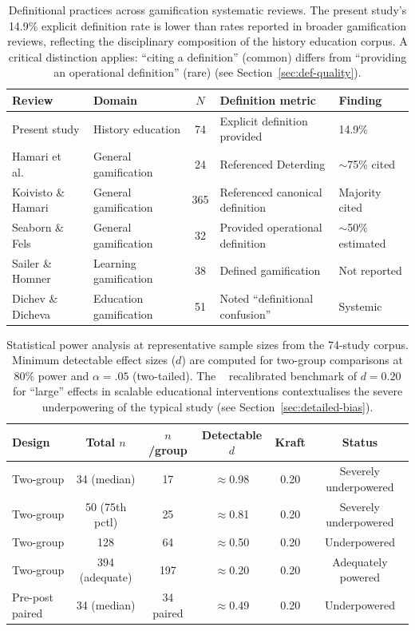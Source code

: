 \begin{table}[!h]
\centering
\caption{Definitional practices across gamification systematic reviews. The present study's 14.9\% explicit definition rate is lower than rates reported in broader gamification reviews, reflecting the disciplinary composition of the history education corpus. A critical distinction applies: ``citing a definition'' (common) differs from ``providing an operational definition'' (rare) (see Section~\ref{sec:def-quality}).}
\label{tab:cross-domain-definitions}
\small
\begin{tabular}{@{}p{3.5cm}p{2.5cm}cp{3cm}p{3cm}@{}}
\toprule
Review & Domain & $N$ & Definition metric & Finding \\
\midrule
Present study \cite{Korniienko2025mrqs} & History education & 74 & Explicit definition provided & 14.9\% \\
Hamari et al.\ \cite{Hamari2014} & General gamification & 24 & Referenced Deterding \cite{Deterding2011} & $\sim$75\% cited \\
Koivisto \& Hamari \cite{KoivistoHamari2019} & General gamification & 365 & Referenced canonical definition & Majority cited \\
Seaborn \& Fels \cite{SEABORN201514} & General gamification & 32 & Provided operational definition & $\sim$50\% estimated \\
Sailer \& Homner \cite{SailerHomner2020} & Learning gamification & 38 & Defined gamification & Not reported \\
Dichev \& Dicheva \citeauthor{DichevDicheva2017}~\cite{DichevDicheva2017} & Education gamification & 51 & Noted ``definitional confusion'' & Systemic \\
\bottomrule
\end{tabular}
\end{table}

\begin{table}[!h]
\centering
\caption{Statistical power analysis at representative sample sizes from the 74-study corpus. Minimum detectable effect sizes ($d$) are computed for two-group comparisons at 80\% power and $\alpha = .05$ (two-tailed). The \citeauthor{Kraft2020}~\cite{Kraft2020} recalibrated benchmark of $d = 0.20$ for ``large'' effects in scalable educational interventions contextualises the severe underpowering of the typical study (see Section~\ref{sec:detailed-bias}).}
\label{tab:power-analysis}
\small
\begin{tabular}{@{}lccccc@{}}
\toprule
Design & Total $n$ & $n$/group & Detectable $d$ & Kraft & Status \\
\midrule
Two-group & 34 (median) & 17 & $\approx$0.98 & 0.20 & Severely underpowered \\
Two-group & 50 (75th pctl) & 25 & $\approx$0.81 & 0.20 & Severely underpowered \\
Two-group & 128 & 64 & $\approx$0.50 & 0.20 & Underpowered \\
Two-group & 394 (adequate) & 197 & $\approx$0.20 & 0.20 & Adequately powered \\
Pre-post paired & 34 (median) & 34 paired & $\approx$0.49 & 0.20 & Underpowered \\
\bottomrule
\end{tabular}
\end{table}

